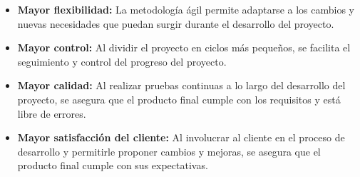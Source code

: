 \begin{itemize}
    \item \textbf{Mayor flexibilidad:} La metodología ágil permite adaptarse a los cambios y nuevas necesidades
    que puedan surgir durante el desarrollo del proyecto.
    \item \textbf{Mayor control:} Al dividir el proyecto en ciclos más pequeños, se facilita el seguimiento y
    control del progreso del proyecto.
    \item \textbf{Mayor calidad:} Al realizar pruebas continuas a lo largo del desarrollo del proyecto, se asegura
    que el producto final cumple con los requisitos y está libre de errores.
    \item \textbf{Mayor satisfacción del cliente:} Al involucrar al cliente en el proceso de desarrollo y permitirle
    proponer cambios y mejoras, se asegura que el producto final cumple con sus expectativas.
\end{itemize}
